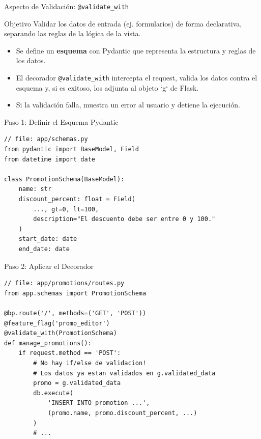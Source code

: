 \documentclass[spanish]{beamer}
\begin{document}
\begin{frame}{Aspecto de Validación: \texttt{@validate\_with}}
    \begin{block}{Objetivo}
        Validar los datos de entrada (ej. formularios) de forma declarativa, separando las reglas de la lógica de la vista.
    \end{block}
    \begin{itemize}
        \item Se define un \textbf{esquema} con Pydantic que representa la estructura y reglas de los datos.
        \item El decorador \texttt{@validate\_with} intercepta el request, valida los datos contra el esquema y, si es exitoso, los adjunta al objeto `g` de Flask.
        \item Si la validación falla, muestra un error al usuario y detiene la ejecución.
    \end{itemize}
\end{frame}

\begin{frame}[fragile]{Paso 1: Definir el Esquema Pydantic}
    \begin{lstlisting}
// file: app/schemas.py
from pydantic import BaseModel, Field
from datetime import date

class PromotionSchema(BaseModel):
    name: str
    discount_percent: float = Field(
        ..., gt=0, lt=100,
        description="El descuento debe ser entre 0 y 100."
    )
    start_date: date
    end_date: date
    \end{lstlisting}
\end{frame}

\begin{frame}[fragile]{Paso 2: Aplicar el Decorador}
    \begin{lstlisting}
// file: app/promotions/routes.py
from app.schemas import PromotionSchema

@bp.route('/', methods=('GET', 'POST'))
@feature_flag('promo_editor')
@validate_with(PromotionSchema)
def manage_promotions():
    if request.method == 'POST':
        # No hay if/else de validacion!
        # Los datos ya estan validados en g.validated_data
        promo = g.validated_data
        db.execute(
            'INSERT INTO promotion ...',
            (promo.name, promo.discount_percent, ...)
        )
        # ...
    \end{lstlisting}
\end{frame}

\end{document}
